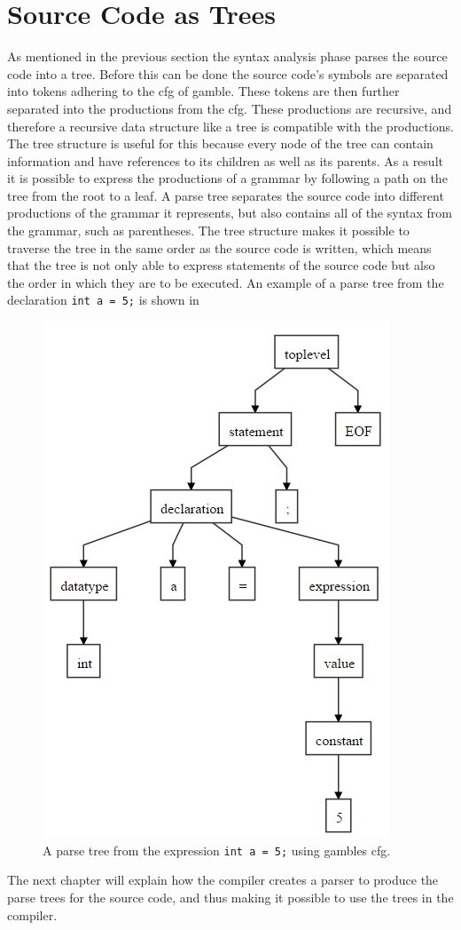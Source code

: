 \section{Source Code as Trees}\label{SourceCodeAsTrees}
As mentioned in the previous section the syntax analysis phase parses the source code into a tree.
Before this can be done the source code's symbols are separated into tokens adhering to the \acrshort{cfg} of \gls{gamble}.
These tokens are then further separated into the productions from the \acrshort{cfg}. 
These productions are recursive, and therefore a recursive data structure like a tree is compatible with the productions.
The tree structure is useful for this because every node of the tree can contain information and have references to its children as well as its parents. 
As a result it is possible to express the productions of a grammar by following a path on the tree from the root to a leaf.
A parse tree separates the source code into different productions of the grammar it represents, but also contains all of the syntax from the grammar, such as parentheses.
The tree structure makes it possible to traverse the tree in the same order as the source code is written, which means that the tree is not only able to express statements of the source code but also the order in which they are to be executed.
An example of a parse tree from the declaration \texttt{int a = 5;} is shown in 

\begin{figure}[ht]
    \centering
    \includegraphics[width=0.5\linewidth]{figures/Trees/PST.PNG}
    \caption{A parse tree from the expression \texttt{int a = 5;} using \glspl{gamble} \acrshort{cfg}.}\label{image:PST}
\end{figure}

The next chapter will explain how the compiler creates a parser to produce the parse trees for the source code, and thus making it possible to use the trees in the compiler.
